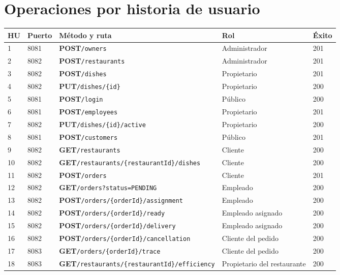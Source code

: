 \documentclass[11pt,a4paper]{article}
\newcommand{\code}[1]{\nolinkurl{#1}}
\newcommand{\route}[2]{\textbf{#1}\enspace\code{#2}}
\begin{document}
\section{Operaciones por historia de usuario}\label{sec:rutas}
\footnotesize
\begin{minipage}{\linewidth}
\begin{tabularx}{\linewidth}{@{}P{8mm}P{12mm}P{51mm}Y P{11mm}@{}}
\toprule
HU & Puerto & Método y ruta & Rol & Éxito \\
 & 8081 & \route{POST}{/owners} & Administrador & 201 \\
2 & 8082 & \route{POST}{/restaurants} & Administrador & 201 \\
3 & 8082 & \route{POST}{/dishes} & Propietario & 201 \\
4 & 8082 & \route{PUT}{/dishes/{id}} & Propietario & 200 \\
5 & 8081 & \route{POST}{/login} & Público & 200 \\
6 & 8081 & \route{POST}{/employees} & Propietario & 201 \\
7 & 8082 & \route{PUT}{/dishes/{id}/active} & Propietario & 200 \\
8 & 8081 & \route{POST}{/customers} & Público & 201 \\
9 & 8082 & \route{GET}{/restaurants} & Cliente & 200 \\
10 & 8082 & \route{GET}{/restaurants/{restaurantId}/dishes} & Cliente & 200 \\
11 & 8082 & \route{POST}{/orders} & Cliente & 201 \\
12 & 8082 & \route{GET}{/orders?status=PENDING} & Empleado & 200 \\
13 & 8082 & \route{POST}{/orders/{orderId}/assignment} & Empleado & 200 \\
14 & 8082 & \route{POST}{/orders/{orderId}/ready} & Empleado asignado & 200 \\
15 & 8082 & \route{POST}{/orders/{orderId}/delivery} & Empleado asignado & 200 \\
16 & 8082 & \route{POST}{/orders/{orderId}/cancellation} & Cliente del pedido & 200 \\
17 & 8083 & \route{GET}{/orders/{orderId}/trace} & Cliente del pedido & 200 \\
18 & 8083 & \route{GET}{/restaurants/{restaurantId}/efficiency} & Propietario del restaurante & 200 \\
\bottomrule
\end{tabularx}
\end{minipage}
\normalsize
\end{document}
